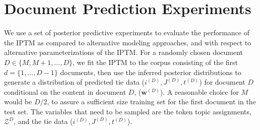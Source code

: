\documentclass[a4paper]{article}
\begin{document}
     \section{Document Prediction Experiments} \label{sec:PosteriorPredictive}
 We use a set of posterior predictive experiments to evaluate the performance of the IPTM as compared to alternative modeling approaches, and with respect to alternative parameterizations of the IPTM. For a randomly chosen document $D \in \{M,M+1,\hdots, D\}$, we fit the IPTM to the corpus consisting of the first $d = \{1,\hdots,D-1\}$ documents, then use the inferred posterior distributions to generate a distribution of predicted tie data ($i^{(D)}, J^{(D)}, t^{(D)}$) for document $D$ conditional on the content in document $D$, ($\boldsymbol{w}^{(D)}$).  A reasonable choice for $M$ would be $D/2$, to assure a sufficient size training set for the first document in the test set. The variables that need to be sampled are the token topic assignments, $\mathcal{Z}^{D}$, and the tie data ($i^{(D)}, J^{(D)}, t^{(D)}$). 
\end{document}
